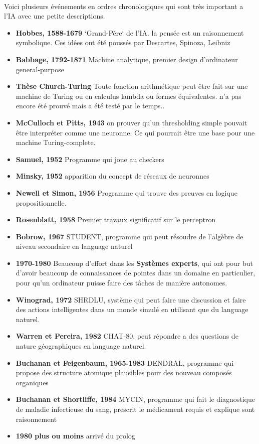 \documentclass[oneside]{book}
\begin{document}
\paragraph{}
Voici plusieurs événements en ordres chronologiques qui sont très important a l'IA avec une petite descriptions.
\begin{itemize}


\item \textbf{Hobbes, 1588-1679}
`Grand-Père` de l'IA. la pensée est un raisonnement symbolique. Ces idées ont été poussés par Descartes, Spinoza, Leibniz

\item \textbf{Babbage, 1792-1871}
Machine analytique, premier design d'ordinateur general-purpose

\item \textbf{Thèse Church-Turing}
Toute fonction arithmétique peut être fait sur une machine de Turing ou en calculus lambda ou formes équivalentes. n'a pas encore été prouvé mais a été testé par le temps..
\item \textbf{McCulloch et Pitts, 1943}
on prouver qu'un thresholding simple pouvait être interpréter comme une neuronne. Ce qui pourrait être une base pour une machine Turing-complete.
\item \textbf{Samuel, 1952}
Programme qui joue au checkers
\item \textbf{Minsky, 1952}
apparition du concept de réseaux de neuronnes
\item \textbf{Newell et Simon, 1956}
Programme qui trouve des preuves en logique propositionnelle.

\item \textbf{Rosenblatt, 1958}
Premier travaux significatif sur le perceptron
\item \textbf{Bobrow, 1967}
STUDENT, programme qui peut résoudre de l'algèbre de niveau secondaire en language naturel

\item \textbf{1970-1980}
Beaucoup d'effort dans les \textbf{Systèmes experts}, qui ont pour but d'avoir beaucoup de connaissances de pointes dans un domaine en particulier, pour qu'un ordinateur puisse faire des tâches de manière autonomes.
\item \textbf{Winograd, 1972}
SHRDLU, système qui peut faire une discussion et faire des actions intelligentes dans un monde simulé en utilisant que du language naturel.
\item \textbf{Warren et Pereira, 1982}
CHAT-80, peut répondre a des questions de nature géographiques en language naturel.
\item \textbf{Buchanan et Feigenbaum, 1965-1983}
DENDRAL, programme qui propose des structure atomique plausibles pour des nouveau composés organiques
\item \textbf{Buchanan et Shortliffe, 1984}
MYCIN, programme qui fait le diagnostique de maladie infectieuse du sang, prescrit le médicament requis et explique sont raisonnement
\item \textbf{1980 plus ou moins}
arrivé du prolog
\end{itemize}
\end{document}
